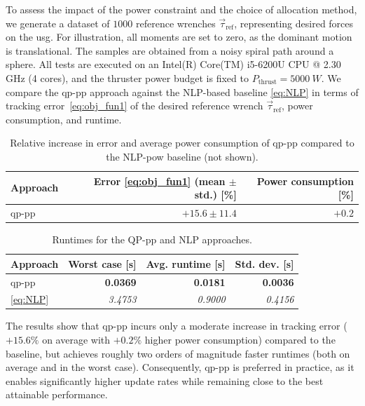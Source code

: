 To assess the impact of the power constraint and the choice of allocation method, 
we generate a dataset of \(1000\) reference wrenches \(\vec{\tau}_{\mathrm{ref}}\), 
representing desired forces on the \gls{usg}. For illustration, all moments are set to zero,
as the dominant motion is translational. The samples are obtained from a noisy spiral 
path around a sphere. All tests are executed on an Intel(R) Core(TM) i5-6200U 
CPU @ 2.30\,GHz (4 cores), and the thruster power budget is fixed to 
\(P_{\mathrm{thrust}} = \SI{5000}{W}\). We compare the \gls{qp}-pp approach against the 
NLP-based baseline \eqref{eq:NLP} in terms of tracking error~\eqref{eq:obj_fun1} of the desired reference wrench $\vec{\tau}_{\mathrm{ref}}$, power 
consumption, and runtime.

\begin{table}[h!]
\centering
\begin{tabular}{|l|r|r|}
\hline
Approach 
& Error \eqref{eq:obj_fun1} (mean \(\pm\) std.) [\%]
& Power consumption [\%] \\ \hline
\gls{qp}-pp   
& \(+15.6 \pm 11.4\)
& \(+0.2\) \\ \hline
\end{tabular}
\caption{Relative increase in error and average power consumption of \gls{qp}-pp 
compared to the NLP-pow baseline (not shown).}
\label{tab:comparison_power_err}
\end{table}

\begin{table}[h!]
\centering
\begin{tabular}{|l|r|r|r|}
\hline
Approach & Worst case [s] & Avg. runtime [s] & Std. dev. [s] \\ \hline
\gls{qp}-pp    & \textbf{0.0369} & \textbf{0.0181} & \textbf{0.0036} \\ \hline
\eqref{eq:NLP}    & \textit{3.4753} & \textit{0.9000} & \textit{0.4156} \\ \hline
\end{tabular}
\caption{Runtimes for the QP-pp and NLP approaches.}
\label{tab:comparison_power_runtime}
\end{table}

The results  show that \gls{qp}-pp incurs only a moderate increase in tracking error
(\(+15.6\%\) on average with \(+0.2\%\) higher power consumption) compared to the 
 baseline, but achieves roughly two orders of magnitude faster runtimes 
(both on average and in the worst case). Consequently, \gls{qp}-pp is preferred in 
practice, as it enables significantly higher update rates while remaining close to 
the best attainable performance. 

